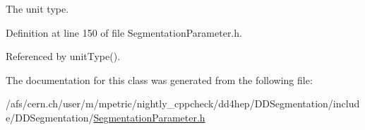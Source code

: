 The unit type. 

Definition at line 150 of file SegmentationParameter.h.

Referenced by unitType().

The documentation for this class was generated from the following file:\begin{DoxyCompactItemize}
\item 
/afs/cern.ch/user/m/mpetric/nightly\_\-cppcheck/dd4hep/DDSegmentation/include/DDSegmentation/\hyperlink{_segmentation_parameter_8h}{SegmentationParameter.h}\end{DoxyCompactItemize}
